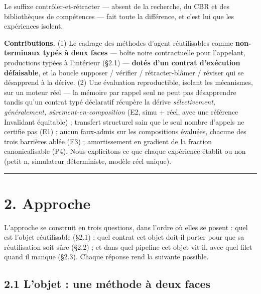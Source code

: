 \documentclass[11pt]{article}
\begin{document}
Le suffixe contrôler-et-rétracter — absent de la recherche, du CBR et des bibliothèques de compétences — fait toute la différence, et c'est lui que les expériences isolent.

\textbf{Contributions.} (1) Le cadrage des méthodes d'agent réutilisables comme \textbf{non-terminaux typés à deux faces} — boîte noire contractuelle pour l'appelant, productions typées à l'intérieur (§2.1) — \textbf{dotés d'un contrat d'exécution défaisable}, et la boucle supposer / vérifier / rétracter-blâmer / réviser qui se désapprend à la dérive. (2) Une évaluation reproductible, isolant les mécanismes, sur un moteur réel — la mémoire par rappel seul ne peut pas désapprendre tandis qu'un contrat typé déclaratif récupère la dérive \emph{sélectivement, généralement, sûrement-en-composition} (E2, simu + réel, avec une référence Invalidant équitable) ; transfert structurel sain que le seul nombre d'appels ne certifie pas (E1) ; aucun faux-admis sur les compositions évaluées, chacune des trois barrières ablée (E3) ; amortissement en gradient de la fraction canonicalisable (P4). Nous explicitons ce que chaque expérience établit ou non (petit n, simulateur déterministe, modèle réel unique).

\medskip\hrule\medskip

\section*{2. Approche}

L'approche se construit en trois questions, dans l'ordre où elles se posent : quel est l'objet réutilisable (§2.1) ; quel contrat cet objet doit-il porter pour que sa réutilisation soit sûre (§2.2) ; et dans quel pipeline cet objet vit-il, avec quel filet quand il manque (§2.3). Chaque réponse rend la suivante possible.

\subsection*{2.1 L'objet : une méthode à deux faces}
\end{document}
